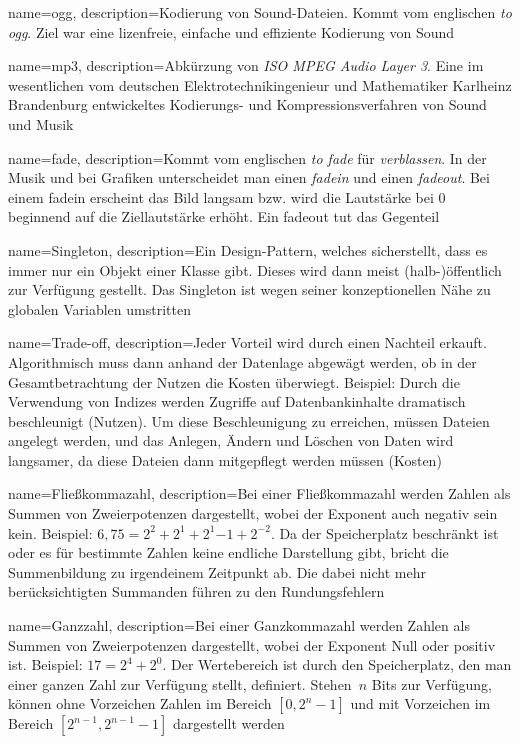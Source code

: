 {
	name={ogg},
	description={Kodierung von Sound-Dateien. Kommt vom englischen \emph{to ogg}. Ziel war eine lizenfreie, einfache und effiziente Kodierung von Sound} 
}

{
	name={mp3},
	description={Abkürzung von \emph{ISO MPEG Audio Layer 3}. Eine im wesentlichen vom deutschen Elektrotechnikingenieur und Mathematiker Karlheinz Brandenburg entwickeltes Kodierungs- und Kompressionsverfahren von Sound und Musik} 
}

{
	name={fade},
	description={Kommt vom englischen \emph{to fade} für \emph{verblassen}. In der Musik und bei Grafiken unterscheidet man einen \emph{fadein} und einen \emph{fadeout}. Bei einem fadein erscheint das Bild langsam bzw. wird die Lautstärke bei 0 beginnend auf die Ziellautstärke erhöht. Ein fadeout tut das Gegenteil} 
}

{
	name={Singleton},
	description={Ein Design-Pattern, welches sicherstellt, dass es immer nur ein Objekt einer Klasse gibt. Dieses wird dann meist (halb-)öffentlich zur Verfügung gestellt. Das Singleton ist wegen seiner konzeptionellen Nähe zu globalen Variablen umstritten} 
}

{
    name={Trade-off},
    description={Jeder Vorteil wird durch einen Nachteil erkauft. Algorithmisch muss dann anhand der Datenlage abgewägt werden, ob in der Gesamtbetrachtung der Nutzen die Kosten überwiegt. Beispiel: Durch die Verwendung von Indizes werden Zugriffe auf Datenbankinhalte dramatisch beschleunigt (Nutzen). Um diese Beschleunigung zu erreichen, müssen Dateien angelegt werden, und das Anlegen, Ändern und Löschen von Daten wird langsamer, da diese Dateien dann mitgepflegt werden müssen (Kosten)} 
}

{
    name={Fließkommazahl},
    description={Bei einer Fließkommazahl werden Zahlen als Summen von Zweierpotenzen dargestellt, wobei der Exponent auch negativ sein kein. Beispiel: $6,75 = 2^2 + 2^1 + 2^1{-1} + 2^{-2}$. Da der Speicherplatz beschränkt ist oder es für bestimmte Zahlen keine endliche Darstellung gibt, bricht die Summenbildung zu irgendeinem Zeitpunkt ab. Die dabei nicht mehr berücksichtigten Summanden führen zu den Rundungsfehlern}
}

{
    name={Ganzzahl},
    description={Bei einer Ganzkommazahl werden Zahlen als Summen von Zweierpotenzen dargestellt, wobei der Exponent Null oder positiv ist. Beispiel: $17 = 2^4 + 2^0$. Der Wertebereich ist durch den Speicherplatz, den man einer ganzen Zahl zur Verfügung stellt, definiert. Stehen~$n$ Bits zur Verfügung, können ohne Vorzeichen Zahlen im Bereich $[0, 2^n-1]$ und mit Vorzeichen im Bereich $[2^{n-1}, 2^{n-1}-1]$ dargestellt werden} 
}


